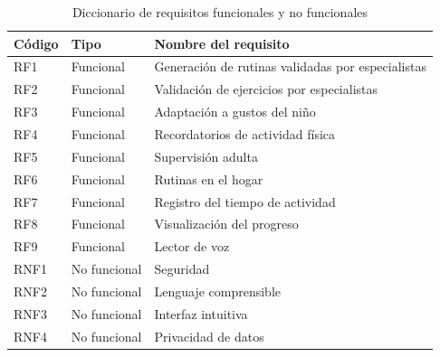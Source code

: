 					\begin{table}[H]
						\centering\small
						\caption{Diccionario de requisitos funcionales y no funcionales}
						\label{tab:diccionario_rf}
						\begin{tabular}{p{2.5cm}p{3.5cm}p{7.5cm}}
							\hline
							\textbf{Código} & \textbf{Tipo} & \textbf{Nombre del requisito} \\
							\hline
							RF1 & Funcional & Generación de rutinas validadas por especialistas \\
							
							RF2 & Funcional & Validación de ejercicios por especialistas \\
							
							RF3 & Funcional & Adaptación a gustos del niño \\
							
							RF4 & Funcional & Recordatorios de actividad física \\
							
							RF5 & Funcional & Supervisión adulta \\
							
							RF6 & Funcional & Rutinas en el hogar \\
							
							RF7 & Funcional & Registro del tiempo de actividad \\
							
							RF8 & Funcional & Visualización del progreso \\
							
							RF9 & Funcional & Lector de voz \\
							
							RNF1 & No funcional & Seguridad \\
							
							RNF2 & No funcional & Lenguaje comprensible \\
							
							RNF3 & No funcional & Interfaz intuitiva \\
							
							RNF4 & No funcional & Privacidad de datos \\
							\hline
						\end{tabular}
					\end{table} \tblnote
					

